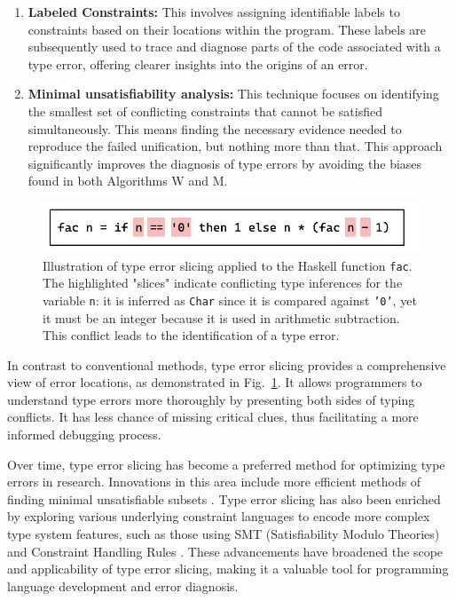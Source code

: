 \begin{enumerate}
  \item {
    \textbf{Labeled Constraints:}
    This involves assigning identifiable labels to constraints based on their locations within the program. These labels are subsequently used to trace and diagnose parts of the code associated with a type error, offering clearer insights into the origins of an error.
  }
  \item {
    \textbf{Minimal unsatisfiability analysis:} 
    This technique focuses on identifying the smallest set of conflicting constraints that cannot be satisfied simultaneously. This means finding the necessary evidence needed to reproduce the failed unification, but nothing more than that. This approach significantly improves the diagnosis of type errors by avoiding the biases found in both Algorithms W and M.
  }
\end{enumerate}


\begin{figure}[hbt]
  \includegraphics[width=0.8\linewidth]{TypeErrorSlicing.pdf}
  \caption[Illustration of type error slicing applied to the Haskell function \texttt{fac}]{
    \label{fig:type-error-slicing}
    Illustration of type error slicing applied to the Haskell function \texttt{fac}. The highlighted "slices" indicate conflicting type inferences for the variable \texttt{n}: it is inferred as \texttt{Char} since it is compared against \texttt{'0'}, yet it must be an integer because it is used in arithmetic subtraction. This conflict leads to the identification of a type error.}
\end{figure}

In contrast to conventional methods, type error slicing provides a comprehensive view of error locations, as demonstrated in Fig.~\ref{fig:type-error-slicing}. It allows programmers to understand type errors more thoroughly by presenting both sides of typing conflicts. It has less chance of missing critical clues, thus facilitating a more informed debugging process.

Over time, type error slicing has become a preferred method for optimizing type errors in research. Innovations in this area include more efficient methods of finding minimal unsatisfiable subsets \cite{Liffiton2008-mx, Bailey2005-hi, Bacchus2015-of}. Type error slicing has also been enriched by exploring various underlying constraint languages to encode more complex type system features, such as those using SMT (Satisfiability Modulo Theories) \cite{Pavlinovic2015-ke} and Constraint Handling Rules \cite{Stuckey2003-pz}. These advancements have broadened the scope and applicability of type error slicing, making it a valuable tool for programming language development and error diagnosis.


